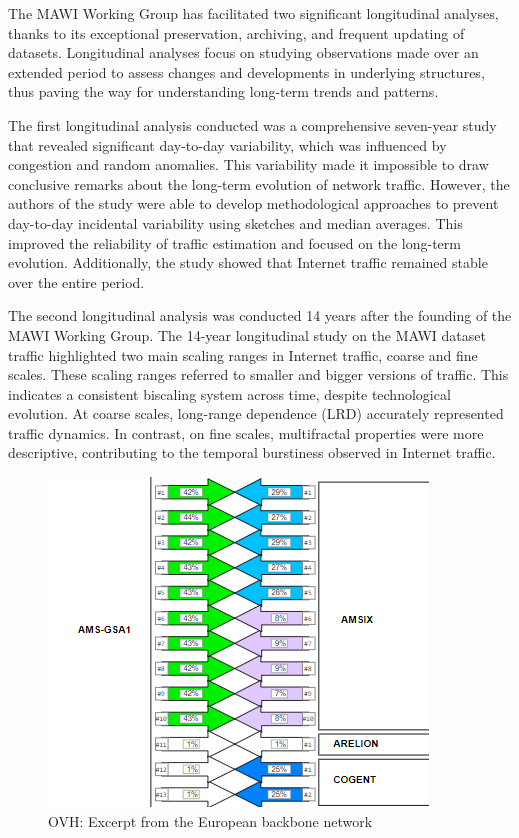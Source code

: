 \documentclass[sigconf,authorversion,nonacm]{acmart}
\begin{document}
The MAWI Working Group has facilitated two significant longitudinal analyses, thanks to its exceptional preservation, archiving, and frequent updating of datasets. Longitudinal analyses focus on studying observations made over an extended period to assess changes and developments in underlying structures, thus paving the way for understanding long-term trends and patterns.

The first longitudinal analysis \cite{5061979} conducted was a comprehensive seven-year study that revealed significant day-to-day variability, which was influenced by congestion and random anomalies. This variability made it impossible to draw conclusive remarks about the long-term evolution of network traffic. However, the authors of the study were able to develop methodological approaches to prevent day-to-day incidental variability using sketches and median averages. This improved the reliability of traffic estimation and focused on the long-term evolution. Additionally, the study showed that Internet traffic remained stable over the entire period.

The second longitudinal analysis \cite{7878657} was conducted 14 years after the founding of the MAWI Working Group. The 14-year longitudinal study on the MAWI dataset traffic highlighted two main scaling ranges in Internet traffic, coarse and fine scales. These scaling ranges referred to smaller and bigger versions of traffic. This indicates a consistent biscaling system across time, despite technological evolution. At coarse scales, long-range dependence (LRD) accurately represented traffic dynamics. In contrast, on fine scales, multifractal properties were more descriptive, contributing to the temporal burstiness observed in Internet traffic.

\begin{figure}
    \centering
    \includegraphics[width=0.8\linewidth]{OVH/ovh.png}
    \caption{OVH: Excerpt from the European backbone network}
    \label{OVH: Excerpt from the European backbone network}
\end{figure}
\end{document}
